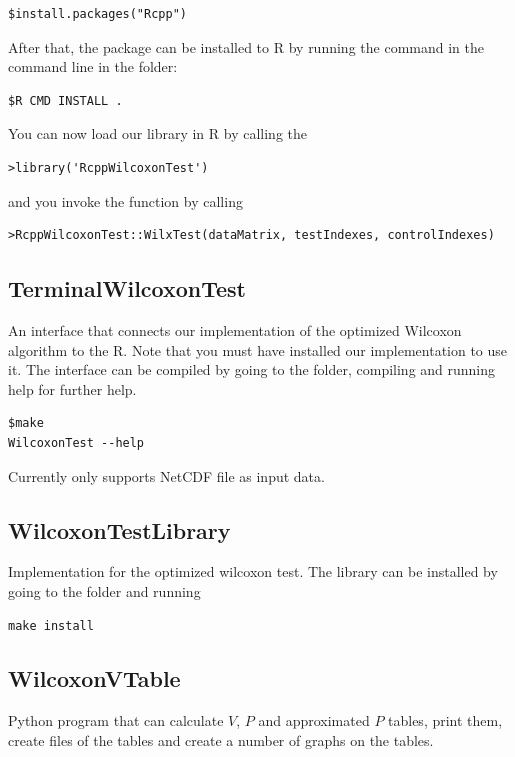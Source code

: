 \documentclass[12pt]{article}
\begin{document}
\begin{lstlisting}
$install.packages("Rcpp")
\end{lstlisting}

After that, the package can be installed to R by running the command in the command line in the folder:

\begin{lstlisting}
$R CMD INSTALL .
\end{lstlisting}

You can now load our library in R by calling the

\begin{lstlisting}
>library('RcppWilcoxonTest')
\end{lstlisting}

and you invoke the function by calling

\begin{lstlisting}
>RcppWilcoxonTest::WilxTest(dataMatrix, testIndexes, controlIndexes)
\end{lstlisting}

\subsection{TerminalWilcoxonTest}

An interface that connects our implementation of the optimized Wilcoxon algorithm to the R. Note that you must have installed our implementation to use it. The interface can be compiled by going to the folder, compiling and running help for further help.

\begin{lstlisting}
$make
WilcoxonTest --help
\end{lstlisting}

Currently only supports NetCDF file as input data.

\subsection{WilcoxonTestLibrary}
Implementation for the optimized wilcoxon test. The library can be installed by going to the folder and running

\begin{lstlisting}
make install
\end{lstlisting}

\subsection{WilcoxonVTable}
Python program that can calculate $V$, $P$ and approximated $P$ tables, print them, create files of the tables and create a number of graphs on the tables.
\end{document}
